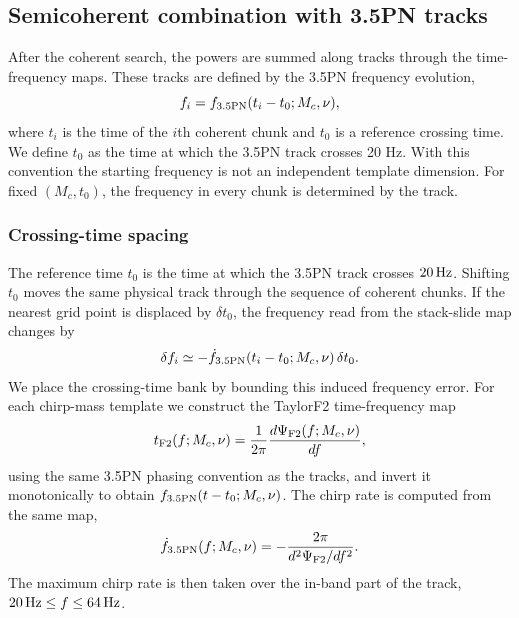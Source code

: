 \documentclass[aps,prd,amsmath,floats,floatfix, twocolumn,
superscriptaddress,nofootinbib,showpacs]{revtex4-2}
\begin{document}
\subsection{Semicoherent combination with 3.5PN tracks}
\label{sec:semicoherent_tracks}
After the coherent search, the powers are summed along tracks through the
time-frequency maps.  These tracks are defined by the
3.5PN frequency evolution,
\begin{equation}
f_i
=
f_{\rm 3.5PN}(t_i-t_0;M_c,\nu),
\end{equation}
where $t_i$ is the time of the $i$th coherent chunk and $t_0$ is a reference
crossing time.  We define $t_0$ as the time at which the 3.5PN track crosses
20 Hz.  With this convention the starting frequency is not an independent
template dimension.  For fixed $(M_c,t_0)$, the frequency in every chunk is
determined by the track.

\subsubsection{Crossing-time spacing}
The reference time $t_0$ is the time at which the 3.5PN track crosses
$20\,{\rm Hz}$.  Shifting $t_0$ moves the same physical track through the
sequence of coherent chunks.  If the nearest grid point is displaced by
$\delta t_0$, the frequency read from the stack-slide map changes by
\begin{equation}
\delta f_i
\simeq
-\dot{f}_{\rm 3.5PN}(t_i-t_0;M_c,\nu)\,\delta t_0 .
\end{equation}
We place the crossing-time bank by bounding this induced frequency error.
For each chirp-mass template we construct the TaylorF2 time-frequency map
\begin{equation}
t_{\rm F2}(f;M_c,\nu)
=
\frac{1}{2\pi}
\frac{d\Psi_{\rm F2}(f;M_c,\nu)}{df},
\end{equation}
using the same 3.5PN phasing convention as the tracks, and invert it
monotonically to obtain $f_{\rm 3.5PN}(t-t_0;M_c,\nu)$.  The chirp rate is
computed from the same map,
\begin{equation}
\dot f_{\rm 3.5PN}(f;M_c,\nu)
=
-\frac{2\pi}{d^2\Psi_{\rm F2}/df^2}.
\end{equation}
The maximum chirp rate is then taken over the in-band part of the track,
$20\,{\rm Hz}\le f\le64\,{\rm Hz}$.
\end{document}
